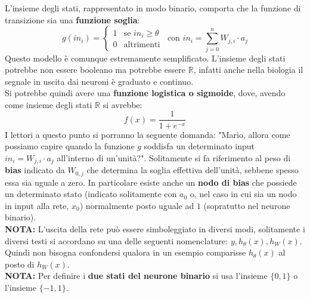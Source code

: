 L'insieme degli stati, rappresentato in modo binario, comporta che la funzione
di transizione sia una \textbf{funzione soglia}:
\[g(in_i)=
	\begin{cases}
		1 & \mbox{se } in_i\geq \theta \\
		0 & \mbox{altrimenti}                                   
	\end{cases}\,\,\,\mbox{con $in_i = \sum_{j=0}^n W_{j,i}\cdot a_j$}
\]
Questo modello è comunque estremamente semplificato. L'insieme degli stati potrebbe non essere booleano ma potrebbe essere $\mathbb{R}$, infatti anche nella biologia il segnale in uscita dai neuroni è graduato e continuo. \\
Si potrebbe quindi avere una \textbf{funzione logistica o sigmoide}, dove, avendo come insieme degli stati $\mathbb{R}$ si avrebbe:
\[f(x)=\frac{1}{1+e^{-x}}\]
I lettori a questo punto si porranno la seguente domanda: "Mario, allora come possiamo capire quando la funzione $g$ soddisfa un determinato input $in_i = W_{j,i}\cdot a_j$ all'interno di un'unità?". Solitamente si fa riferimento al peso di \textbf{bias} indicato da $W_{0,j}$ che determina la soglia effettiva dell'unità, sebbene spesso essa sia uguale a zero. In particolare esiste anche un \textbf{nodo di bias}  che possiede un determinato stato (indicato solitamente con $a_0$ o, nel caso in cui sia un nodo in input alla rete, $x_0$) normalmente posto uguale ad $1$ (sopratutto nel neurone binario).\\
\textbf{NOTA:} L'uscita della rete può essere simboleggiato in diversi modi, solitamente i diversi testi si accordano su una delle seguenti nomenclature: $y, h_\theta(x), h_W(x)$. Quindi non bisogna confondersi qualora in un esempio comparisse $h_\theta(x)$ al posto di $h_W(x)$.\\
\textbf{NOTA:} Per definire i \textbf{due stati del neurone binario} si usa l'insieme $\{0, 1\}$ o l'insieme $\{-1, 1\}$.
